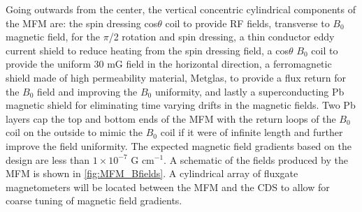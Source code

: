 
Going outwards from the center, the vertical concentric cylindrical components of the MFM are: the spin dressing cos$\theta$ coil to provide RF fields, transverse to $B_0$ magnetic field, for the $\pi$/2 rotation and spin dressing, a thin conductor eddy current shield to reduce heating from the spin dressing field, a cos$\theta$ $B_0$ coil to provide the uniform 30 mG field in the horizontal direction, a ferromagnetic shield made of high permeability material, Metglas, to provide a flux return for the $B_0$ field and improving the $B_0$ uniformity, and lastly a superconducting Pb magnetic shield for eliminating time varying drifts in the magnetic fields. Two Pb layers cap the top and bottom ends of the MFM with the return loops of the $B_0$ coil on the outside to mimic the $B_0$ coil if it were of infinite length and further improve the field uniformity. The expected magnetic field gradients based on the design are less than $1\times 10^{-7}$ G cm$^{-1}$. A schematic of the fields produced by the MFM is shown in \cref{fig:MFM_Bfields}. A cylindrical array of fluxgate magnetometers will be located between the MFM and the CDS \cite{Ahmed2019} to allow for coarse tuning of magnetic field gradients.

